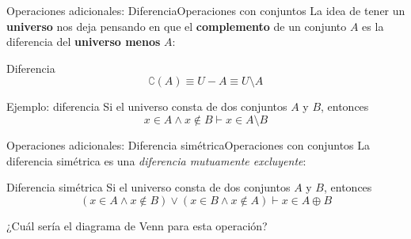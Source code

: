 \documentclass[spanish, c]{beamer}
\newcommand\blfootnote[1]{%
\begingroup
\renewcommand\thefootnote{}\footnote{#1}%
\addtocounter{footnote}{-1}%
\endgroup
}
\begin{document}

\begin{frame}{Operaciones adicionales: Diferencia}{Operaciones con conjuntos}
    La idea de tener un \textbf{universo} nos deja pensando en que el \textbf{complemento} de un conjunto $A$ es la \alert{diferencia} del \textbf{universo menos} $A$:

    \begin{block}{Diferencia}
        $$\complement(A) \equiv U - A \equiv U \setminus A$$
    \end{block}

    \bigskip

    \begin{block}{Ejemplo: diferencia}
        Si el universo consta de dos conjuntos $A$ y $B$, entonces
        $$x \in A \wedge x \not \in B \vdash x \in A \setminus B$$
    \end{block}
\end{frame}

\begin{frame}{Operaciones adicionales: Diferencia simétrica}{Operaciones con conjuntos}
    La \alert{diferencia simétrica} es una \textit{diferencia mutuamente excluyente}:

    \bigskip

    \begin{block}{Diferencia simétrica}
        Si el universo consta de dos conjuntos $A$ y $B$, entonces
        $$(x \in A \wedge x \not \in B) \vee (x \in B \wedge x \not \in A) \vdash x \in A \oplus B$$
    \end{block} \pause

    \bigskip

    ¿Cuál sería el diagrama de Venn para esta operación?
\end{frame}
\end{document}
